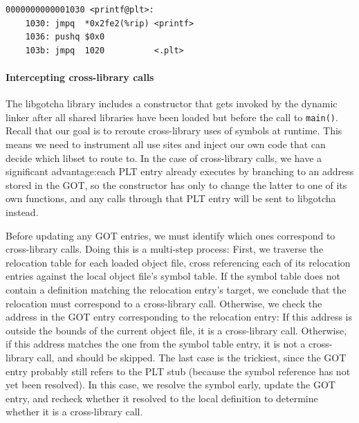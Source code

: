 \begin{lstlisting}[label=lst:plt,caption=Example PLT entry for call to \texttt{printf()}]
0000000000001030 <printf@plt>:
	1030: jmpq  *0x2fe2(%rip) <printf>
	1036: pushq $0x0
	103b: jmpq  1020          <.plt>
\end{lstlisting}

\paragraph{Intercepting cross-library calls}

The libgotcha library includes a constructor that gets invoked by the dynamic linker
after all shared libraries have been loaded but before the call to \texttt{main()}.
Recall that our goal is to reroute cross-library uses of symbols at runtime.  This
means we need to instrument all use sites and inject our own code that can decide
which libset to route to.  In the case of cross-library calls, we have a significant
advantage:\@ each PLT entry already executes by branching to an address stored in the
GOT, so the constructor has only to change the latter to one of its own functions,
and any calls through that PLT entry will be sent to libgotcha instead.

Before updating any GOT entries, we must identify
which ones correspond to cross-library calls.  Doing this is a multi-step process:
First, we traverse the relocation table for each loaded object file, cross
referencing each of its relocation entries against the local object file's symbol
table.  If the symbol table does not contain a definition matching the relocation
entry's target, we conclude that the relocation must correspond to a cross-library
call.  Otherwise, we check the address in the GOT entry corresponding to the
relocation entry:  If this address is outside the bounds of the current object file,
it is a cross-library call.  Otherwise, if this address matches the one from the
symbol table entry, it is not a cross-library call, and should be skipped.  The last
case is the trickiest, since the GOT entry probably still refers to the PLT stub
(because the symbol reference has not yet been resolved).  In this case, we resolve
the symbol
early, update the GOT entry, and recheck whether it resolved to the local definition
to determine whether it is a cross-library call.

